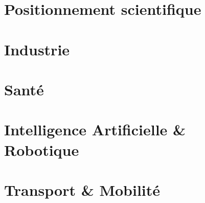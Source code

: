 \tableofcontentslide[onlyparts]

\begin{bibliographysection}

\part{Positionnement scientifique}

\MinskyAItrue %
\OECDAIfalse %
\EUAIActtrue %
\localized
\localized
\localized
\localized
\localized

\part{Industrie}

\localized
\localized
\localized
\localized

\part{Santé}

\localized
\localized
\localized

\part{Intelligence Artificielle \& Robotique}

\localized
\localized
\localized
\localized

\part{Transport \& Mobilité}

\localized
\localized
\localized
\localized
\localized


\end{bibliographysection}
